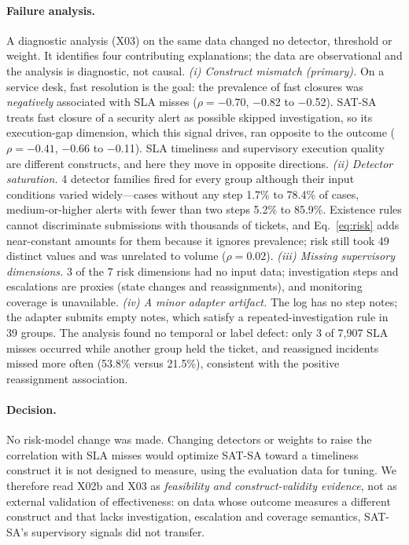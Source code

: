 \paragraph{Failure analysis.} A diagnostic analysis (X03) on the same data changed no
detector, threshold or weight. It identifies four contributing explanations; the
data are observational and the analysis is diagnostic, not causal.
\emph{(i) Construct mismatch (primary).} On a service desk, fast resolution is the
goal: the prevalence of fast closures was \emph{negatively} associated with SLA misses
($\rho=\ensuremath{-}0.70$, \ensuremath{-}0.82 to \ensuremath{-}0.52). SAT-SA treats
fast closure of a security alert as possible skipped investigation, so its execution-gap
dimension, which this signal drives, ran opposite to the outcome
($\rho=\ensuremath{-}0.41$, \ensuremath{-}0.66 to \ensuremath{-}0.11). SLA
timeliness and supervisory execution quality are different constructs, and here they
move in opposite directions. \emph{(ii) Detector saturation.} 4 detector
families fired for every group although their input conditions varied widely---cases
without any step 1.7\% to 78.4\% of cases, medium-or-higher alerts
with fewer than two steps 5.2\% to 85.9\%. Existence rules
cannot discriminate submissions with thousands of tickets, and Eq.~\eqref{eq:risk}
adds near-constant amounts for them because it ignores prevalence; risk still took
49 distinct values and was unrelated to volume
($\rho=0.02$). \emph{(iii) Missing supervisory dimensions.}
3 of the 7 risk dimensions had no input data;
investigation steps and escalations are proxies (state changes and reassignments), and
monitoring coverage is unavailable. \emph{(iv) A minor adapter artifact.} The log has
no step notes; the adapter submits empty notes, which satisfy a repeated-investigation
rule in 39 groups. The analysis found no temporal or label defect: only
3 of 7,907 SLA misses occurred while another group held the
ticket, and reassigned incidents missed more often (53.8\% versus
21.5\%), consistent with the positive reassignment association.

\paragraph{Decision.} No risk-model change was made. Changing detectors or weights to
raise the correlation with SLA misses would optimize SAT-SA toward a timeliness
construct it is not designed to measure, using the evaluation data for tuning. We
therefore read X02b and X03 as \emph{feasibility and construct-validity evidence}, not
as external validation of effectiveness: on data whose outcome measures a different
construct and that lacks investigation, escalation and coverage semantics, SAT-SA's
supervisory signals did not transfer.
